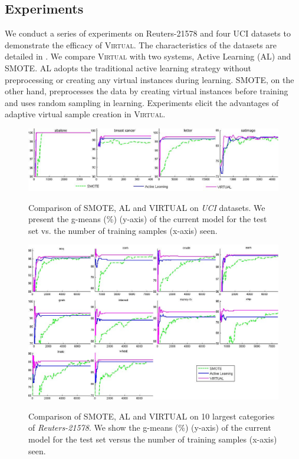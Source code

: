 \subsection{Experiments}
We conduct a series of experiments on Reuters-21578 and four UCI datasets to demonstrate the efficacy of \textsc{Virtual}. The characteristics of the datasets are detailed in \cite{Ertekin_dissertation}. We compare \textsc{Virtual} with two systems, Active Learning (AL) and SMOTE. AL adopts the traditional active learning strategy without preprocessing or creating any virtual instances during learning. SMOTE, on the other hand, preprocesses the data by creating virtual instances before training and uses random sampling in learning. Experiments elicit the advantages of adaptive virtual sample creation in \textsc{Virtual}.

\begin{figure}[!t]
  \centering
  \scalebox{1}
  {\includegraphics[width=\textwidth]{Figures/virtual/uci-graphs.eps}}\\
  \caption{Comparison of SMOTE, AL and VIRTUAL on \emph{UCI} datasets.
  We present the g-means (\%) (y-axis) of the current model for the test set
  vs. the number of training samples (x-axis) seen.}
  \label{fig:uci}
\end{figure}


\begin{figure}[!b]
  \centering
  \scalebox{1}
  {\includegraphics[width=\textwidth]{Figures/virtual/reuters.eps}}\\
  \caption{Comparison of SMOTE, AL and VIRTUAL on 10 largest categories of \emph{Reuters-21578}.
  We show the g-means (\%) (y-axis) of the current model for the test set
  versus the number of training samples (x-axis) seen.}
  \label{fig:reuters}
\end{figure}


